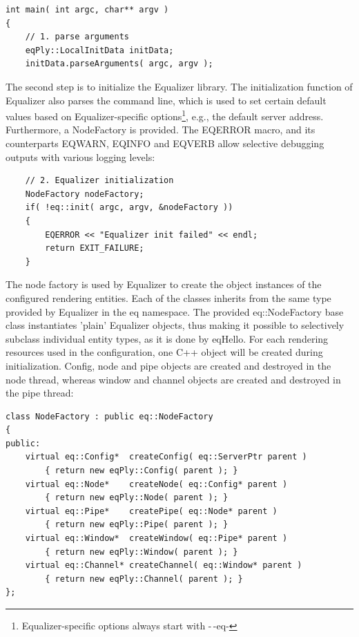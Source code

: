 \documentclass[10pt,a4]{scrartcl}
\begin{document}
{\footnotesize\begin{lstlisting}
int main( int argc, char** argv )
{
    // 1. parse arguments
    eqPly::LocalInitData initData;
    initData.parseArguments( argc, argv );
\end{lstlisting}}

The second step is to initialize the Equalizer library. The
initialization function of Equalizer also parses the command line, which
is used to set certain default values based on Equalizer-specific
options\footnote{Equalizer-specific options always start with -\,-eq-},
e.g., the default server address. Furthermore, a \textsf{NodeFactory} is
provided. The \textsf{EQERROR} macro, and its counterparts
\textsf{EQWARN}, \textsf{EQINFO} and \textsf{EQVERB} allow selective
debugging outputs with various logging levels:

{\footnotesize\begin{lstlisting}
    // 2. Equalizer initialization
    NodeFactory nodeFactory;
    if( !eq::init( argc, argv, &nodeFactory ))
    {
        EQERROR << "Equalizer init failed" << endl;
        return EXIT_FAILURE;
    }
\end{lstlisting}}%

The node factory is used by Equalizer to create the object instances of
the configured rendering entities. Each of the classes inherits from the
same type provided by Equalizer in the \textsf{eq} namespace. The
provided \textsf{eq::NodeFactory} base class instantiates 'plain'
Equalizer objects, thus making it possible to selectively subclass
individual entity types, as it is done by \textsf{eqHello}. For each
rendering resources used in the configuration, one C++ object will be
created during initialization. Config, node and pipe objects are created and
destroyed in the node thread, whereas window and channel objects are
created and destroyed in the pipe thread:

{\footnotesize\begin{lstlisting}
class NodeFactory : public eq::NodeFactory
{
public:
    virtual eq::Config*  createConfig( eq::ServerPtr parent )
        { return new eqPly::Config( parent ); }
    virtual eq::Node*    createNode( eq::Config* parent )  
        { return new eqPly::Node( parent ); }
    virtual eq::Pipe*    createPipe( eq::Node* parent )
        { return new eqPly::Pipe( parent ); }
    virtual eq::Window*  createWindow( eq::Pipe* parent )
        { return new eqPly::Window( parent ); }
    virtual eq::Channel* createChannel( eq::Window* parent )
        { return new eqPly::Channel( parent ); }
};
\end{lstlisting}}
\end{document}
